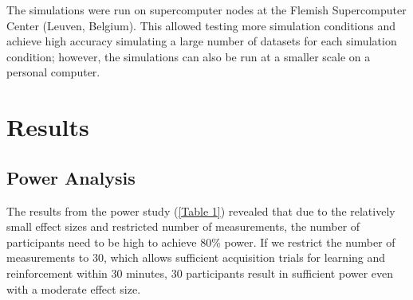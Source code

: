 \documentclass{article}
\begin{document}
The simulations were run on supercomputer nodes at the Flemish Supercomputer Center (Leuven, Belgium). This allowed testing more simulation conditions and achieve high accuracy simulating a large number of datasets for each simulation condition; however, the simulations can also be run at a smaller scale on a personal computer.

\section{Results}

\subsection{Power Analysis}

The results from the power study (\ref{Table 1}) revealed that due to the relatively small effect sizes and restricted number of measurements, the number of participants need to be high to achieve 80\% power. If we restrict the number of measurements to 30, which allows sufficient acquisition trials for learning and reinforcement within 30 minutes, 30 participants result in sufficient power even with a moderate effect size.
\end{document}
